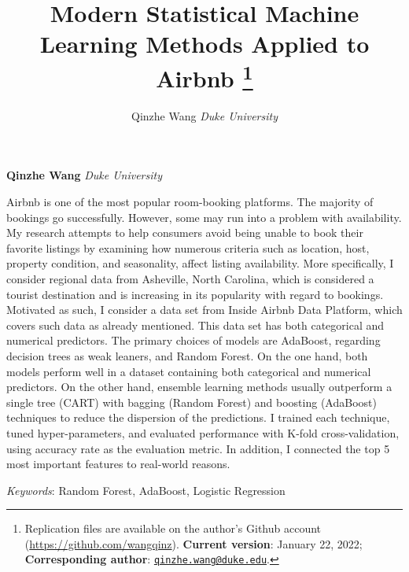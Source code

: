 \documentclass[11pt,]{article}
\title{Modern Statistical Machine Learning Methods Applied to
Airbnb \thanks{Replication files are available on the author's Github
account (\url{https://github.com/wangqinz}). \textbf{Current version}:
January 22, 2022; \textbf{Corresponding author}:
\href{mailto:qinzhe.wang@duke.edu}{\nolinkurl{qinzhe.wang@duke.edu}}.}  }
\author{\Large Qinzhe Wang\vspace{0.05in} \newline\normalsize\emph{Duke
University}  }
\date{}
\newcommand*{\authorfont}{\fontfamily{phv}\selectfont}
\renewenvironment{abstract}
 {{%
    \setlength{\leftmargin}{0mm}
    \setlength{\rightmargin}{\leftmargin}%
  }%
  \relax}
 {\endlist}
\begin{document}
	
%    


{%
\setlength{\parindent}{0pt}
\thispagestyle{plain}
{\fontsize{18}{20}\selectfont\raggedright 
\maketitle  %

}

{
   \vskip 13.5pt\relax \normalsize\fontsize{11}{12} 
\textbf{\authorfont Qinzhe Wang} \hskip 15pt \emph{\small Duke
University}   

}

}








\begin{abstract}

    \hbox{\vrule height .2pt width 39.14pc}

    \vskip 8.5pt %

\noindent Airbnb is one of the most popular room-booking platforms. The
majority of bookings go successfully. However, some may run into a
problem with availability. My research attempts to help consumers avoid
being unable to book their favorite listings by examining how numerous
criteria such as location, host, property condition, and seasonality,
affect listing availability. More specifically, I consider regional data
from Asheville, North Carolina, which is considered a tourist
destination and is increasing in its popularity with regard to bookings.
Motivated as such, I consider a data set from Inside Airbnb Data
Platform, which covers such data as already mentioned. This data set has
both categorical and numerical predictors. The primary choices of models
are AdaBoost, regarding decision trees as weak leaners, and Random
Forest. On the one hand, both models perform well in a dataset
containing both categorical and numerical predictors. On the other hand,
ensemble learning methods usually outperform a single tree (CART) with
bagging (Random Forest) and boosting (AdaBoost) techniques to reduce the
dispersion of the predictions. I trained each technique, tuned
hyper-parameters, and evaluated performance with K-fold
cross-validation, using accuracy rate as the evaluation metric. In
addition, I connected the top 5 most important features to real-world
reasons.


\vskip 8.5pt \noindent \emph{Keywords}: Random Forest, AdaBoost,
Logistic Regression \par

    \hbox{\vrule height .2pt width 39.14pc}



\end{abstract}
\end{document}

